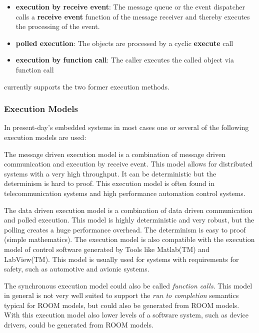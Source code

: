 \begin{itemize}
\item \textbf{execution by receive event}: The message queue or the event dispatcher calls a 
\textbf{receive event} function of the message receiver and thereby executes the processing of the event.
\item \textbf{polled execution}: The objects are processed by a cyclic \textbf{execute} call
\item \textbf{execution by function call}: The caller executes the called object via function call
\end{itemize}

\eTrice{} currently supports the two former execution methods.

\subsubsection*{Execution Models}

In present-day's embedded systems in most cases one or several of the following execution models are used:


The message driven execution model is a combination of message driven communication and execution by 
receive event.
This model allows for distributed systems with a very high throughput.
It can be deterministic but the determinism is hard to proof.
This execution model is often found in telecommunication systems and high performance automation control 
systems.


The data driven execution model is a combination of data driven communication and polled execution.
This model is highly deterministic and very robust, but the polling creates a huge performance overhead.
The determinism is easy to proof (simple mathematics). 
The execution model is also compatible with the execution model of control software generated by Tools 
like Matlab(TM) and LabView(TM).
This model is usually used for systems with requirements for safety, such as automotive and avionic systems.


The synchronous execution model could also be called \emph{function calls}. 
This model in general is not very well suited to support the \emph{run to completion} semantics typical 
for ROOM models, but could also be generated from ROOM models. 
With this execution model also lower levels of a software system, such as device drivers, could be 
generated from ROOM models.
